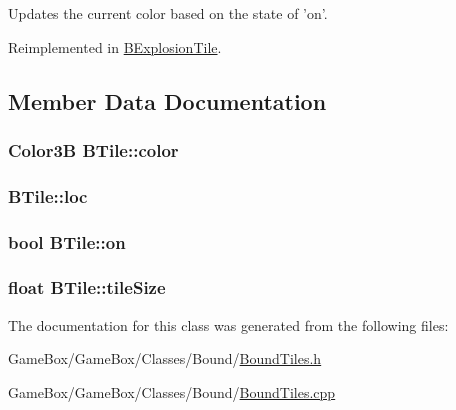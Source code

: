 \-Updates the current color based on the state of 'on'. 



\-Reimplemented in \hyperlink{class_b_explosion_tile_a4c58075332815284002ddcff3fa2c5b0}{\-B\-Explosion\-Tile}.



\subsection{\-Member \-Data \-Documentation}
\hypertarget{class_b_tile_a24df3d28185701700b2fd217641775f6}{
\subsubsection[{color}]{\setlength{\rightskip}{0pt plus 5cm}\-Color3\-B {\bf \-B\-Tile\-::color}}}\label{class_b_tile_a24df3d28185701700b2fd217641775f6}
\hypertarget{class_b_tile_a9a106634c3890eaa7a69cddc9680d822}{
\subsubsection[{loc}]{ {\bf \-B\-Tile\-::loc}}}\label{class_b_tile_a9a106634c3890eaa7a69cddc9680d822}
\hypertarget{class_b_tile_a793fe978c4d34fc611dbe7d21079610d}{
\subsubsection[{on}]{\setlength{\rightskip}{0pt plus 5cm}bool {\bf \-B\-Tile\-::on}}}\label{class_b_tile_a793fe978c4d34fc611dbe7d21079610d}
\hypertarget{class_b_tile_a0c85a54373837c9bbe0fa2f83475234b}{
\subsubsection[{tile\-Size}]{\setlength{\rightskip}{0pt plus 5cm}float {\bf \-B\-Tile\-::tile\-Size}}}\label{class_b_tile_a0c85a54373837c9bbe0fa2f83475234b}


\-The documentation for this class was generated from the following files\-:\begin{DoxyCompactItemize}
\item 
\-Game\-Box/\-Game\-Box/\-Classes/\-Bound/\hyperlink{_bound_tiles_8h}{\-Bound\-Tiles.\-h}\item 
\-Game\-Box/\-Game\-Box/\-Classes/\-Bound/\hyperlink{_bound_tiles_8cpp}{\-Bound\-Tiles.\-cpp}\end{DoxyCompactItemize}
